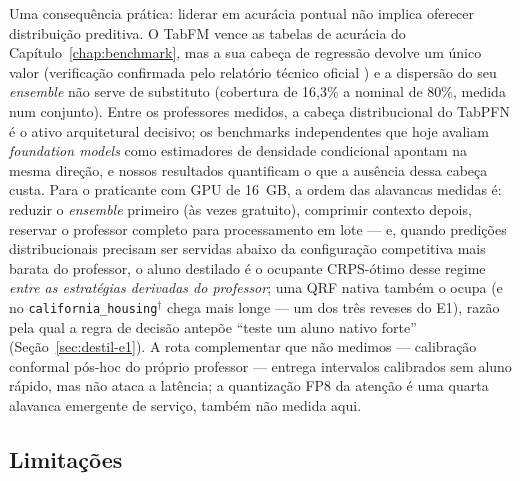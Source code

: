 Uma consequência prática: liderar em acurácia pontual não implica
oferecer distribuição preditiva. O TabFM vence as tabelas de acurácia
do Capítulo~\ref{chap:benchmark}, mas a sua cabeça de regressão
devolve um único valor
(verificação confirmada pelo relatório técnico oficial
\citep{kong2026}) e a dispersão do seu \emph{ensemble} não serve de
substituto (cobertura de 16,3\% a nominal de
80\%, medida num conjunto). Entre os professores medidos, a cabeça distribucional do TabPFN é
o ativo arquitetural decisivo; os benchmarks independentes que hoje
avaliam \emph{foundation models} como estimadores de densidade condicional
\citep{izbicki2026,landsgesell2026} apontam na mesma direção, e nossos
resultados quantificam o que a ausência dessa cabeça custa. Para o
praticante com GPU de 16~GB, a ordem das alavancas medidas é: reduzir
o \emph{ensemble} primeiro (às vezes gratuito), comprimir contexto depois,
reservar o professor completo para processamento em lote --- e, quando
predições distribucionais precisam ser servidas abaixo da configuração
competitiva mais barata do professor, o aluno destilado é o ocupante
CRPS-ótimo desse regime \emph{entre as estratégias derivadas do
professor}; uma QRF nativa também o ocupa (e no
\texttt{california\_\allowbreak housing}$^\dagger$ chega mais longe ---
um dos três reveses do E1), razão pela qual a regra de decisão
antepõe ``teste um aluno nativo forte'' (Seção~\ref{sec:destil-e1}). A rota complementar que não medimos ---
calibração conformal pós-hoc do próprio professor \citep{park2026} ---
entrega intervalos calibrados sem aluno rápido, mas não ataca a
latência; a quantização FP8 da atenção \citep{kubler2026} é uma quarta
alavanca emergente de serviço, também não medida aqui.

\subsection{Limitações}
\label{sec:destil-limitacoes}

